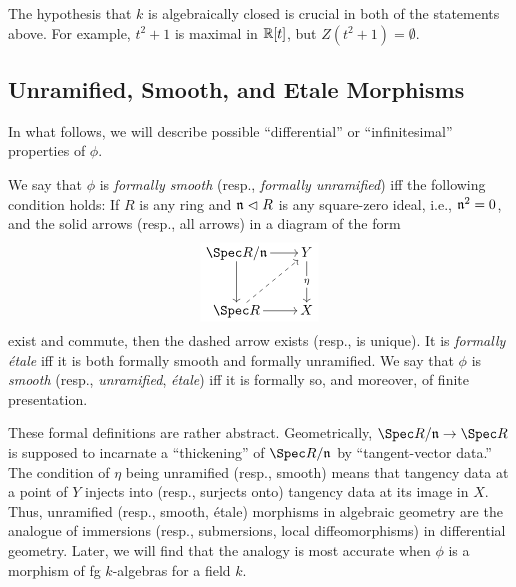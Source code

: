 \documentclass[10pt,final,oneside]{amsbook}
\numberwithin{equation}{section}
\begin{document}
The hypothesis that $k$ is algebraically closed is crucial in both of the statements above.
For example, $t^2 + 1$ is maximal in $\mathbb{R}[t]$, but $Z(t^2 + 1) = \emptyset$.

\begin{comment}
\subsection{Non-Algebraically Closed Fields}

In general, maximal ideals of $K[\smash{\bb{A}^d}]$ correspond to $d$-tuples of Galois orbits in an algebraic closure $\smash{K^\al}$ of $K$.
\end{comment}


\subsection{Unramified, Smooth, and Etale Morphisms}

In what follows, we will describe possible ``differential'' or ``infinitesimal'' properties of $\phi$.

We say that $\phi$ is \emph{formally smooth} (resp., \emph{formally unramified}) iff the following condition holds:
If $R$ is any ring and $\mathfrak{n} \vartriangleleft R$ is any square-zero ideal, i.e., $\mathfrak{n}^2 = 0$, and the solid arrows (resp., all arrows) in a diagram of the form
\begin{equation}\label{SqZero}
\begin{tikzpicture}[baseline=(current  bounding  box.center)]
\tikzstyle{every node}=[fill=white,  inner sep=2pt]
\matrix (m)
[	matrix of math nodes,
	row sep 		=	3em,
	column sep 	=	2em,
	text height	=	1.5ex,
	text depth	=	0.25ex
]
{ 		\Spec R/\fr{n}			&Y\\
		\Spec R					&X\\
};
\path[->, font=\scriptsize]
(m-1-1)	edge									(m-1-2)	
(m-1-1)	edge									(m-2-1)
(m-1-2)	edge node{$\eta$}				(m-2-2)
(m-2-1)	edge									(m-2-2);
\path[dashed, ->, font=\scriptsize]
(m-2-1)	edge									(m-1-2);
\end{tikzpicture}
\end{equation}
exist and commute, then the dashed arrow exists  (resp., is unique).
It is \emph{formally \'etale} iff it is both formally smooth and formally unramified.
We say that $\phi$ is \emph{smooth} (resp., \emph{unramified}, \emph{\'etale}) iff it is formally so, and moreover, of finite presentation.

These formal definitions are rather abstract.
Geometrically, $\Spec R/\fr{n} \to \Spec R$ is supposed to incarnate a ``thickening'' of $\Spec R/\fr{n}$ by ``tangent-vector data.''
The condition of $\eta$ being unramified (resp., smooth) means that tangency data at a point of $Y$ injects into (resp., surjects onto) tangency data at its image in $X$.
Thus, unramified (resp., smooth, \'etale) morphisms in algebraic geometry are the analogue of immersions (resp., submersions, local diffeomorphisms) in differential geometry.
Later, we will find that the analogy is most accurate when $\phi$ is a morphism of fg $k$-algebras for a field $k$.
\end{document}
